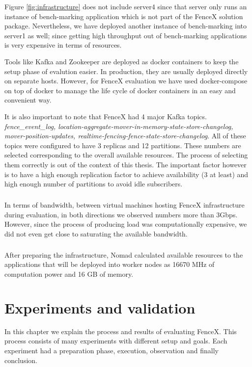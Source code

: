 \documentclass[a4]{report}
\begin{document}
    Figure \ref{fig:infrastructure} does not include server4 since that server only runs an instance of bench-marking
    application which is not part of the FenceX solution package.
    Nevertheless, we have deployed another instance of bench-marking into server1 as well;
    since getting high throughput out of bench-marking applications is very expensive in terms of resources.

    Tools like Kafka and Zookeeper are deployed as docker containers to keep the setup phase of evalution easier.
    In production, they are usually deployed directly on separate hosts.
    However, for FenceX evaluation we have used docker-compose on top of docker to manage the life cycle of docker
    containers in an easy and convenient way.

    It is also important to note that FenceX had 4 major Kafka topics.
    \textit{fence\_event\_log, location-aggregate-mover-in-memory-state-store-changelog, mover-position-updates,
        realtime-fencing-fence-state-store-changelog}.
    All of these topics were configured to have 3 replicas and 12 partitions.
    These numbers are selected corresponding to the overall available resources.
    The process of selecting them correctly is out of the context of this thesis.
    The important factor however is to have a high enough replication factor to achieve availability (3 at least) and
    high enough number of partitions to avoid idle subscribers.

    \paragraph{}
    In terms of bandwidth, between virtual machines hosting FenceX infrastructure during evaluation, in both
    directions we observed numbers more than 3Gbps.
    However, since the process of producing load was computationally expensive, we did not even get close to saturating
    the available bandwidth.

    \paragraph{}
    After preparing the infrastructure, Nomad calculated available resources to the applications that will be
    deployed into worker nodes as 16670 MHz of computation power and 16 GB of memory.

    \chapter{Experiments and validation}
    In this chapter we explain the process and results of evaluating FenceX.
    This process consists of many experiments with different setup and goals.
    Each experiment had a preparation phase, execution, observation and finally conclusion.
\end{document}
